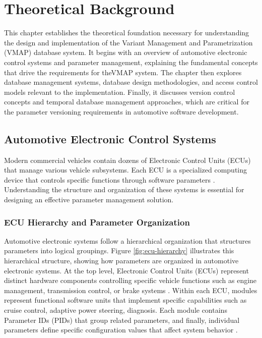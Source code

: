 \chapter{Theoretical Background}
\label{chap:theoretical-background}

This chapter establishes the theoretical foundation necessary for understanding the design and implementation of the Variant Management and Parametrization (VMAP) database system. It begins with an overview of automotive electronic control systems and parameter management, explaining the fundamental concepts that drive the requirements for the\ac{VMAP} system. The chapter then explores database management systems, database design methodologies, and access control models relevant to the implementation. Finally, it discusses version control concepts and temporal database management approaches, which are critical for the parameter versioning requirements in automotive software development.

\section{Automotive Electronic Control Systems}
\label{sec:automotive-electronic-systems}

Modern commercial vehicles contain dozens of Electronic Control Units (ECUs) that manage various vehicle subsystems. Each \ac{ECU} is a specialized computing device that controls specific functions through software parameters \cite{staron2021automotive}. Understanding the structure and organization of these systems is essential for designing an effective parameter management solution.

\subsection{ECU Hierarchy and Parameter Organization}
\label{subsec:ecu-hierarchy}

Automotive electronic systems follow a hierarchical organization that structures parameters into logical groupings. Figure \ref{fig:ecu-hierarchy} illustrates this hierarchical structure, showing how parameters are organized in automotive electronic systems. At the top level, Electronic Control Units (ECUs) represent distinct hardware components controlling specific vehicle functions such as engine management, transmission control, or brake systems \cite{kiencke2000automotive}. Within each \ac{ECU}, modules represent functional software units that implement specific capabilities such as cruise control, adaptive power steering, diagnosis. Each module contains Parameter IDs (PIDs) that group related parameters, and finally, individual parameters define specific configuration values that affect system behavior \cite{staron2021autosar}.

